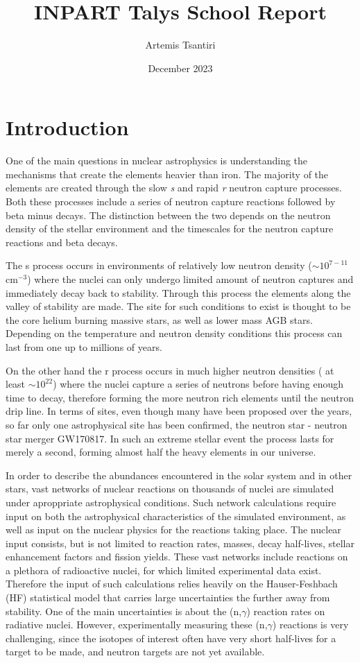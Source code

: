 \documentclass{article}
\title{INPART Talys School Report}
\author{Artemis Tsantiri}
\date{December 2023}
\newcommand{\g}{$\gamma$}
\begin{document}
\maketitle

\section*{Introduction}

One of the main questions in nuclear astrophysics is understanding the mechanisms that create the elements heavier than iron. The majority of the elements are created through the slow \textit{s} and rapid \textit{r} neutron capture processes. Both these processes include a series of neutron capture reactions followed by beta minus decays. The distinction between the two depends on the neutron density of the stellar environment and the timescales for the neutron capture reactions and beta decays. \cite{b2fh}
\par The s process occurs in environments of relatively low neutron density ($\sim10 ^{7-11}$ cm$^{-3}$) where the nuclei can only undergo limited amount of neutron captures and immediately decay back to stability. Through this process the elements along the valley of stability are made. The site for such conditions to exist is thought to be the core helium burning massive stars, as well as lower mass AGB stars. Depending on the temperature and neutron density conditions this process can last from one up to millions of years. \cite{iliadis, s-review}
\par On the other hand the r process occurs in much higher neutron densities ( at least $\sim10 ^{22}$) where the nuclei capture a series of neutrons before having enough time to decay, therefore forming the more neutron rich elements until the neutron drip line. In terms of sites, even though many have been proposed over the years, so far only one astrophysical site has been confirmed, the neutron star - neutron star merger GW170817. In such an extreme stellar event the process lasts for merely a second, forming almost half the heavy elements in our universe.
\cite{r-review, larsen_spyrou_review}
\par In order to describe the abundances encountered in the solar system and in other stars, vast networks of nuclear reactions on thousands of nuclei are simulated under aproppriate astrophysical conditions. Such network calculations require input on both the astrophysical characteristics of the simulated environment, as well as input on the nuclear physics for the reactions taking place. The nuclear input consists, but is not limited to reaction rates, masses, decay half-lives, stellar enhancement factors and fission yields. These vast networks include reactions on a plethora of radioactive nuclei, for which limited experimental data exist. Therefore the input of such calculations relies heavily on the Hauser-Feshbach (HF) statistical model that carries large uncertainties the further away from stability. One of the main uncertainties is about the (n,\g) reaction rates on radiative nuclei. However, experimentally measuring these (n,\g) reactions is very challenging, since the isotopes of interest often have very short half-lives for a target to be made, and neutron targets are not yet available. 
\end{document}
